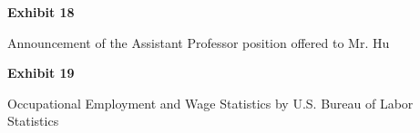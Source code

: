 \documentclass{article}
\begin{document}
% 

% 

% 

% 

\vspace*{\fill}
\begin{center}

{\LARGE \bf
Exhibit 18
}

\vspace{10\baselineskip}

{\large Announcement of the Assistant Professor position offered to Mr. Hu}

\end{center}
\vspace*{\fill}

% 


\vspace*{\fill}
\begin{center}

{\LARGE \bf
Exhibit 19
}

\vspace{10\baselineskip}

{\large Occupational Employment and Wage Statistics by U.S. Bureau of Labor Statistics}

\end{center}
\vspace*{\fill}

% 

% 

% 

% 
\end{document}
